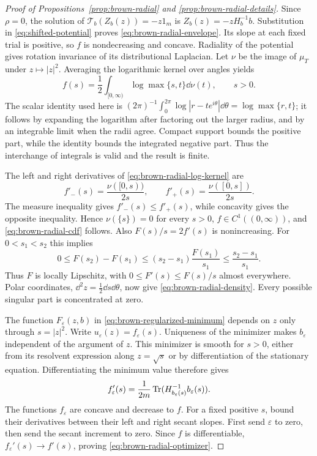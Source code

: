 \begin{proof}[Proof of Propositions~\ref{prop:brown-radial} and
\ref{prop:brown-radial-details}]
Since $\rho=0$, the solution of $\mathcal T_b(Z_b(z))=-z1_m$ is $Z_b(z)=-zH_b^{-1}b$.
Substitution in \eqref{eq:shifted-potential} proves \eqref{eq:brown-radial-envelope}.
Its slope at each fixed trial is positive, so $f$ is nondecreasing and concave.
Radiality of the potential gives rotation invariance of its distributional Laplacian.
Let $\nu$ be the image of $\mu_T$ under $z\mapsto|z|^2$.
Averaging the logarithmic kernel over angles yields
\begin{equation}\label{eq:brown-radial-log-kernel}
 f(s)=\frac12\int_{[0,\infty)}\log\max\{s,t\}\dd\nu(t),
 \qquad s>0.
\end{equation}
The scalar identity used here is $(2\pi)^{-1}\int_0^{2\pi}\log|r-te^{i\theta}|\dd\theta =\log\max\{r,t\}$; it follows by expanding the logarithm after factoring out the larger radius, and by an integrable limit when the radii agree.
Compact support bounds the positive part, while the identity bounds the integrated negative part.
Thus the interchange of integrals is valid and the result is finite.

The left and right derivatives of \eqref{eq:brown-radial-log-kernel} are
\[
 f'_-(s)=\frac{\nu([0,s))}{2s},\qquad
 f'_+(s)=\frac{\nu([0,s])}{2s}.
\]
The measure inequality gives $f'_-(s)\le f'_+(s)$, while concavity gives the opposite inequality.
Hence $\nu(\{s\})=0$ for every $s>0$, $f\in C^1((0,\infty))$, and \eqref{eq:brown-radial-cdf} follows.
Also $F(s)/s=2f'(s)$ is nonincreasing.
For $0<s_1<s_2$ this implies
\[
 0\le F(s_2)-F(s_1)
 \le (s_2-s_1)\frac{F(s_1)}{s_1}
 \le\frac{s_2-s_1}{s_1}.
\]
Thus $F$ is locally Lipschitz, with $0\le F'(s)\le F(s)/s$ almost everywhere.
Polar coordinates, $\dd^2z=\tfrac12\dd s\dd\theta$, now give \eqref{eq:brown-radial-density}.
Every possible singular part is concentrated at zero.

The function $F_\varepsilon(z,b)$ in \eqref{eq:brown-regularized-minimum} depends on $z$ only through $s=|z|^2$.
Write $u_\varepsilon(z)=f_\varepsilon(s)$.
Uniqueness of the minimizer makes $b_\varepsilon$ independent of the argument of $z$.
This minimizer is smooth for $s>0$, either from its resolvent expression along $z=\sqrt{s}$ or by differentiation of the stationary equation.
Differentiating the minimum value therefore gives
\[
 f_\varepsilon'(s)=\frac1{2m}
          \operatorname{Tr}(H_{b_\varepsilon(s)}^{-1}b_\varepsilon(s)).
\]
The functions $f_\varepsilon$ are concave and decrease to $f$.
For a fixed positive $s$, bound their derivatives between their left and right secant slopes.
First send $\varepsilon$ to zero, then send the secant increment to zero.
Since $f$ is differentiable, $f_\varepsilon'(s)\to f'(s)$, proving \eqref{eq:brown-radial-optimizer}.


\end{proof}
